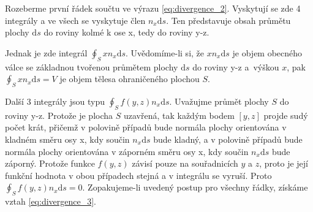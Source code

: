 Rozeberme první řádek součtu ve výrazu \eqref{eq:divergence_2}. Vyskytují se zde 4 integrály a ve všech se vyskytuje člen \(n_x \mathrm{d}s\). Ten představuje obsah průmětu plochy \(\mathrm{d}s\) do roviny kolmé k ose x, tedy do roviny y-z.

Jednak je zde integrál \(\oint_S x n_x \mathrm{d}s\). Uvědomíme-li si, že \(x n_x \mathrm{d}s\) je objem obecného válce se základnou tvořenou průmětem plochy \(\mathrm{d}s\) do roviny y-z a~výškou \(x\), pak \(\oint_S x n_x \mathrm{d}s = V\) je objem tělesa ohraničeného plochou \(S\).


Další 3 integrály jsou typu \(\oint_S f(y, z) n_x \mathrm{d}s\). Uvažujme průmět plochy \(S\) do roviny y-z. Protože je plocha \(S\) uzavřená, tak každým bodem \([y, z]\) projde sudý počet krát, přičemž v polovině případů bude normála plochy orientována v kladném směru osy x, kdy součin \(n_x \mathrm{d}s\) bude kladný, a v polovině případů bude normála plochy orientována v záporném směru osy x, kdy součin \(n_x \mathrm{d}s\) bude záporný. Protože funkce \(f(y, z)\) závisí pouze na souřadnicích \(y\) a \(z\), proto je její funkční hodnota v obou případech stejná a v integrálu se vyruší. Proto \(\oint_S f(y, z) n_x \mathrm{d}s = 0\). Zopakujeme-li uvedený postup pro všechny řádky, získáme vztah \eqref{eq:divergence_3}.

